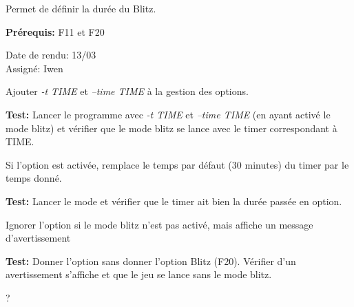 \documentclass{article}
\begin{document}
\begin{needbox}
    Permet de définir la durée du Blitz.

    \textbf{Prérequis:} F11 et F20
    \begin{duedatebox}
        Date de rendu: 13/03\\
        Assigné: Iwen
    \end{duedatebox}
    \begin{subneedbox}
        Ajouter \textit{-t TIME} et \textit{--time TIME} à la gestion des options.

        \textbf{Test:} Lancer le programme avec \textit{-t TIME} et \textit{--time TIME} (en ayant activé le mode blitz)
        et vérifier que le mode blitz se lance avec le timer correspondant à TIME.
    \end{subneedbox}
    \begin{subneedbox}
        Si l'option est activée, remplace le temps par défaut (30 minutes) du timer par le temps donné.

        \textbf{Test:} Lancer le mode et vérifier que le timer ait bien la durée passée en option.
    \end{subneedbox}
    \begin{subneedbox}
        Ignorer l'option si le mode blitz n'est pas activé, mais affiche un message d'avertissement

        \textbf{Test:} Donner l'option sans donner l'option Blitz (F20). Vérifier d'un avertissement s'affiche
        et que le jeu se lance sans le mode blitz.
    \end{subneedbox}
\end{needbox}

\begin{needbox}
    ?
\end{needbox}
\end{document}
